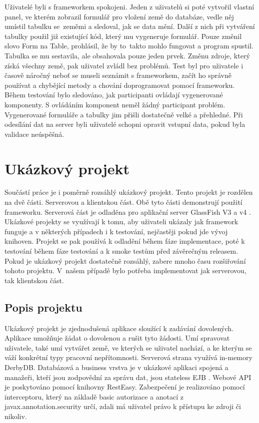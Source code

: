 Uživatelé byli s frameworkem spokojeni. Jeden z uživatelů si poté vytvořil vlastní panel, ve kterém zobrazil formulář pro vložení země do databáze, vedle něj umístil tabulku se~zeměmi a sledoval, jak se data mění. Další z nich při vytváření tabulky použil již existující kód, který mu vygeneruje formulář. Pouze změnil slovo Form na Table, prohlásil, že by to~takto mohlo fungovat a program spustil. Tabulka se mu sestavila, ale obsahovala pouze jeden prvek. Změnu zdroje, který získá všechny země, pak uživatel zvládl bez problémů. Test byl pro uživatele i časově náročný neboť se museli seznámit s frameworkem, začít ho správně používat a chybějící metody a chování doprogramovat pomocí frameworku. Během testování bylo sledováno, jak participanti ovládají vygenerované komponenty. S ovládáním komponent neměl žádný participant problém. Vygenerované formuláře a tabulky jim přišli dostatečně velké a přehledné. Při odesílání dat na server byli uživatelé schopni opravit vstupní data, pokud byla validace neúspěšná. 

\section{Ukázkový projekt}
Součástí práce je i poměrně rozsáhlý ukázkový projekt. Tento projekt je rozdělen na dvě části. Serverovou a klientskou část. Obě tyto části demonstrují použití frameworku. Serverová část je odladěna pro aplikační server GlassFish V3 a v4 \cite{glassfish}. Ukázkové projekty se využívají k tomu, aby uživateli ukázaly jak framework funguje a v některých případech i k testování, nejčastěji pokud jde vývoj knihoven. Projekt se pak používá k odladění během fáze implementace, poté k testování během fáze testování a k smoke testům před závěrečným releasem. Pokud je ukázkový projekt dostatečně rozsáhlý, zabere mnoho času rozšiřování tohoto projektu. V~našem případě bylo potřeba implementovat jak serverovou, tak klientskou část.
\subsection{Popis projektu}
Ukázkový projekt je zjednodušená aplikace sloužící k zadávání dovolených. Aplikace umožňuje žádat o dovolenou a rušit tyto žádosti. Umí spravovat uživatele, také umí vytvářet země, ve kterých se uživatel nachází, a ke kterým se váží konkrétní typy pracovní nepřítomnosti. Serverová strana využívá in-memory DerbyDB. Databázová a business vrstva je v ukázkové aplikaci spojená a manažeři, kteří jsou zodpovědní za správu dat, jsou stateless EJB \cite{javaEE}. Webové API je poskytováno pomocí knihovny RestEasy. Zabezpečení je realizováno pomocí interceptoru, který na základě basic autorizace a anotací z javax.annotation.security určí, zdali má uživatel právo k přístupu ke zdroji či nikoliv.

